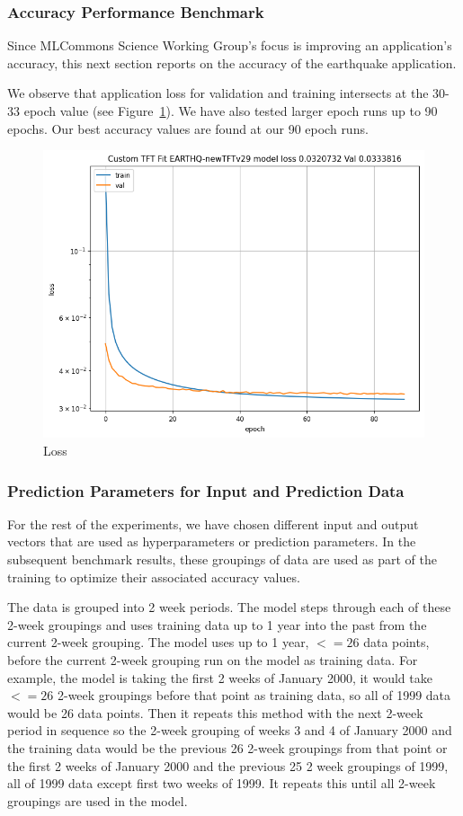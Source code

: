 \documentclass[utf8]{FrontiersinVancouver} %
\begin{document}
\subsubsection{Accuracy Performance Benchmark}
\label{sec:perf-accuracy}

Since MLCommons Science Working Group's focus is improving an application’s accuracy, this next section reports on the accuracy of the earthquake application.

We observe that application loss for validation and training intersects at the 30-33 epoch value (see Figure~\ref{fig:loss}). We have also tested larger epoch runs up to 90 epochs. Our best accuracy values are found at our 90 epoch runs.

\begin{figure}[htb]
    \centering
    \includegraphics[width=0.70\columnwidth]{images/loss90.png}
    \caption{Loss}
    \label{fig:loss}
\end{figure}


\subsubsection{Prediction Parameters for Input and Prediction Data}

For the rest of the experiments, we have chosen different input and output vectors that are used as hyperparameters or prediction parameters. In the subsequent benchmark results, these groupings of data are used as part of the training to optimize their associated accuracy values. 

The data is grouped into 2 week periods. The model steps through each of these 2-week groupings and uses training data up to 1 year into the past from the current 2-week grouping. The model uses up to 1 year, $<=26$ data points, before the current 2-week grouping run on the model as training data. For example, the model is taking the first 2 weeks of January 2000, it would take $<=26$ 2-week groupings before that point as training data, so all of 1999 data would be 26 data points. Then it repeats this method with the next 2-week period in sequence so the 2-week grouping of weeks 3 and 4 of January 2000 and the training data would be the previous 26 2-week groupings from that point or the first 2 weeks of January 2000 and the previous 25 2 week groupings of 1999, all of 1999 data except first two weeks of 1999. It repeats this until all 2-week groupings are used in the model.
\end{document}
